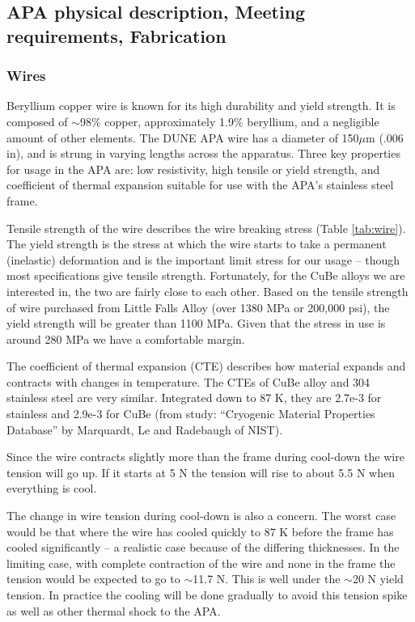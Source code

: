 \subsection{APA physical description, Meeting requirements, Fabrication}
\subsubsection{Wires}

Beryllium copper wire is known for its high durability and yield strength. It is composed of $\sim$98$\%$ copper, approximately 1.9$\%$ beryllium, and a negligible amount of other elements. The DUNE APA wire has a diameter of 150$\mu$m (.006 in), and is strung in varying lengths across the apparatus. Three key properties for usage in the APA are: low resistivity, high tensile or yield strength, and coefficient of thermal expansion suitable for use with the APA's stainless steel frame.

Tensile strength of the wire describes the wire breaking stress (Table \ref{tab:wire}).  The yield strength is the stress at which the wire starts to take a permanent (inelastic) deformation and is the important limit stress for our usage -- though most specifications give tensile strength.  Fortunately, for the CuBe alloys we are interested in, the two are fairly close to each other.  Based on the tensile strength of wire purchased from Little Falls Alloy (over 1380 MPa or 200,000 psi), the yield strength will be greater than 1100 MPa.  Given that the stress in use is around 280 MPa we have a comfortable margin.

The coefficient of thermal expansion (CTE) describes how material expands and contracts with changes in temperature.  The CTEs of CuBe alloy and 304 stainless steel are very similar.  Integrated down to 87 K, they are 2.7e-3 for stainless and 2.9e-3 for CuBe (from study: ``Cryogenic Material Properties Database'' by Marquardt, Le and Radebaugh of NIST).

Since the wire contracts slightly more than the frame during cool-down the wire tension will go up.  If it starts at 5 N the tension will rise to about 5.5 N when everything is cool.  

The change in wire tension during cool-down is also a concern.  The worst case would be that where the wire has cooled quickly to 87 K before the frame has cooled significantly -- a realistic case because of the differing thicknesses.  In the limiting case, with complete contraction of the wire and none in the frame the tension would be expected to go to $\sim$11.7 N.  This is well under the $\sim$20 N yield tension.
In practice the cooling will be done gradually to avoid this tension spike as well as other thermal shock to the APA.

